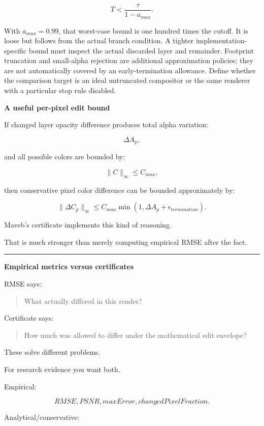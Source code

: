 \[
T<\frac{\tau}{1-a_{max}}.
\]

With \(a_{max}=0.99\), that worst-case bound is one hundred times the cutoff. It is loose but follows from the actual branch condition. A tighter implementation-specific bound must inspect the actual discarded layer and remainder. Footprint truncation and small-alpha rejection are additional approximation policies; they are not automatically covered by an early-termination allowance. Define whether the comparison target is an ideal untruncated compositor or the same renderer with a particular stop rule disabled.

\textbf{A useful per-pixel edit bound}

If changed layer opacity difference produces total alpha variation:

\[
\Delta A_p,
\]

and all possible colors are bounded by:

\[
\|C\|_\infty
\le
C_{max},
\]

then conservative pixel color difference can be bounded approximately by:

\[
\boxed{
\|\Delta C_p\|_\infty
\le
C_{max}
\min(
1,
\Delta A_p+\epsilon_{termination}
).
}
\]

Maveb's certificate implements this kind of reasoning.

That is much stronger than merely computing empirical RMSE after the fact.

\begin{center}\rule{0.5\linewidth}{0.5pt}\end{center}

\textbf{Empirical metrics versus certificates}

RMSE says:

\begin{quote}
What actually differed in this render?
\end{quote}

Certificate says:

\begin{quote}
How much was allowed to differ under the mathematical edit envelope?
\end{quote}

These solve different problems.

For research evidence you want both.

Empirical:

\[
RMSE,
PSNR,
maxError,
changedPixelFraction.
\]

Analytical/conservative:


